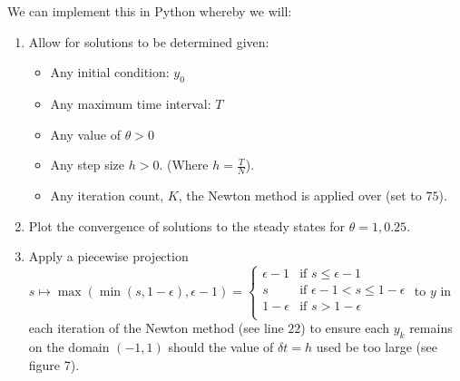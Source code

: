 \documentclass[]{article}
\begin{document}
We can implement this in Python whereby we will:\newline
\begin{enumerate}
    \item Allow for solutions to be determined given:
    \begin{itemize}
        \item  Any initial condition: $y_0$\\
        \item  Any maximum time interval: $T$\\
        \item Any value of $\theta > 0$\\
        \item Any step size $h > 0$. (Where $h = \frac{T}{N}$).\\
        \item Any iteration count, $K$, the Newton method is applied over (set to $75$).\\
    \end{itemize}
    \item Plot the convergence of solutions to the steady states for $\theta =1 , 0.25$. \\
    \item Apply a piecewise projection $s \mapsto \max(\min(s,1-\epsilon),\epsilon-1)= 
\begin{cases} 
\epsilon - 1 & \text{if } s \leq \epsilon - 1 \\[3pt]
s & \text{if } \epsilon - 1 < s \leq 1 - \epsilon \\[3pt]
1 - \epsilon & \text{if } s > 1 - \epsilon\\[3pt]
\end{cases}$ to $y$ in each iteration of the Newton method (see line $22$) to ensure each $y_k$ remains on the domain $(-1,1)$ should the value of $\delta t = h$ used be too large (see figure 7).
\end{enumerate}
\[\]
\end{document}
